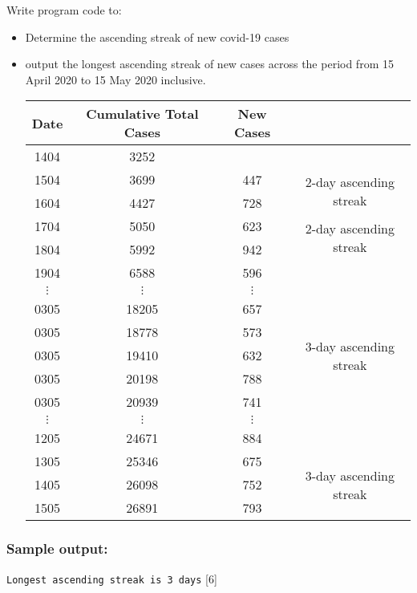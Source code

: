 Write program code to:
\begin{itemize}
\item Determine the ascending streak of new covid-19 cases 
\item output the longest ascending streak of new cases across the period
from 15 April 2020 to 15 May 2020 inclusive.
\noindent \begin{center}
\begin{tabular}{|c|c|c|c|}
\hline 
Date & Cumulative Total Cases & New Cases & \tabularnewline
\hline 
\hline 
1404 & 3252 &  & \tabularnewline
\hline 
1504 & 3699 & 447 & \multirow{2}{*}{2-day ascending streak}\tabularnewline
\cline{1-3} \cline{2-3} \cline{3-3} 
1604 & 4427 & 728 & \tabularnewline
\hline 
1704 & 5050 & 623 & \multirow{2}{*}{2-day ascending streak}\tabularnewline
\cline{1-3} \cline{2-3} \cline{3-3} 
1804 & 5992 & 942 & \tabularnewline
\hline 
1904 & 6588 & 596 & \tabularnewline
\hline 
$\vdots$ & $\vdots$ & $\vdots$ & \tabularnewline
\hline 
0305 & 18205 & 657 & \tabularnewline
\hline 
0305 & 18778 & 573 & \multirow{3}{*}{3-day ascending streak}\tabularnewline
\cline{1-3} \cline{2-3} \cline{3-3} 
0305 & 19410 & 632 & \tabularnewline
\cline{1-3} \cline{2-3} \cline{3-3} 
0305 & 20198 & 788 & \tabularnewline
\hline 
0305 & 20939 & 741 & \tabularnewline
\hline 
$\vdots$ & $\vdots$ & $\vdots$ & \tabularnewline
\hline 
1205 & 24671 & 884 & \tabularnewline
\hline 
1305 & 25346 & 675 & \multirow{3}{*}{3-day ascending streak}\tabularnewline
\cline{1-3} \cline{2-3} \cline{3-3} 
1405 & 26098 & 752 & \tabularnewline
\cline{1-3} \cline{2-3} \cline{3-3} 
1505 & 26891 & 793 & \tabularnewline
\hline 
\end{tabular}
\par\end{center}
\end{itemize}

\subsubsection*{Sample output:}

\texttt{Longest ascending streak is 3 days} \hfill{}{[}6{]}